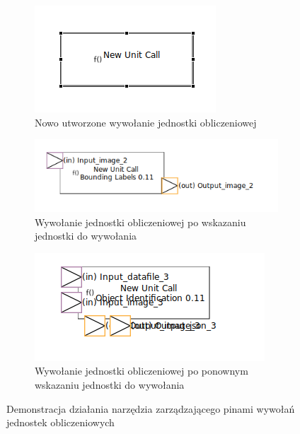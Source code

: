 \begin{figure}
	\centering
	\begin{subfigure}{.3\textwidth}
		\centering
		\includegraphics[width=.99\linewidth]{./images/sirius-desktop-empty-unit-call.png}
		\caption{Nowo utworzone wywołanie jednostki obliczeniowej}\label{rys:sirius-desktop-empty-unit-call}
	\end{subfigure}
	\begin{subfigure}{.3\textwidth}
		\centering
		\includegraphics[width=.99\linewidth]{./images/sirius-desktop-change-unit-to-call-before.png}
		\caption{Wywołanie jednostki obliczeniowej po wskazaniu jednostki do
      wywołania}\label{rys:sirius-desktop-change-unit-to-call-before}
	\end{subfigure}
	\begin{subfigure}{.3\textwidth}
		\centering
		\includegraphics[width=.99\linewidth]{./images/sirius-desktop-change-unit-to-call-after.png}
		\caption{Wywołanie jednostki obliczeniowej po ponownym wskazaniu jednostki do
        wywołania}\label{rys:sirius-desktop-change-unit-to-call-after}
	\end{subfigure}

	\caption{Demonstracja działania narzędzia zarządzającego pinami wywołań
    jednostek obliczeniowych}\label{rys:sirius-desktop-change-unit-to-call}
\end{figure}

